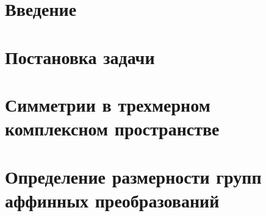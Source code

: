 \documentclass[a4paper,14pt]{extarticle}
\date{}                                           %
\begin{document}
\begin{titlepage}

\end{titlepage}

\newpage\thispagestyle{empty}
\addtocounter{page}{1}




\tableofcontents





\section*{\centering Введение}



\section{Постановка задачи}


\section{Симметрии в трехмерном комплексном пространстве}


\section{Определение размерности групп аффинных преобразований}

\end{document}
